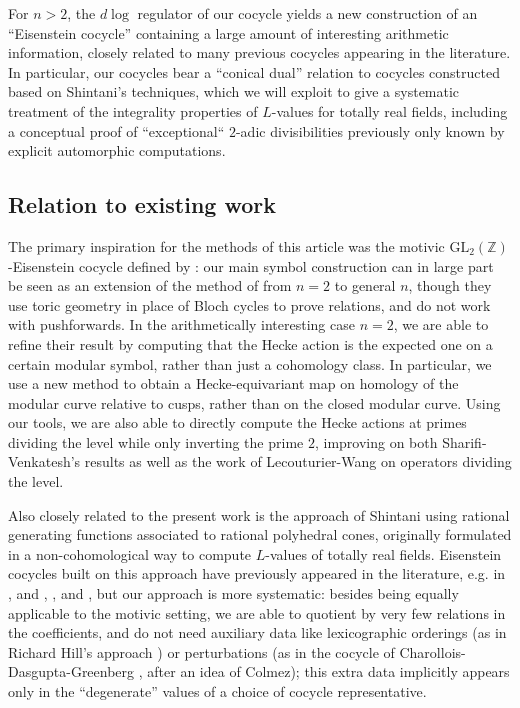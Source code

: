\documentclass[10pt]{amsart}
\theoremstyle{definition}
\newcommand{\Z}{\mathbb{Z}}
\newcommand{\GL}{\mathrm{GL}}
\numberwithin{equation}{section}
\begin{document}
    For $n>2$, the $d\log$ regulator of our cocycle yields a new construction of an ``Eisenstein cocycle'' containing a large amount of interesting arithmetic information, closely related to many previous cocycles appearing in the literature. In particular, our cocycles bear a ``conical dual'' relation to cocycles constructed based on Shintani's techniques, which we will exploit to give a systematic treatment of the integrality properties of $L$-values for totally real fields, including a conceptual proof of ``exceptional`` $2$-adic divisibilities previously only known by explicit automorphic computations.

    \subsection{Relation to existing work}
    
    The primary inspiration for the methods of this article was the motivic $\GL_2(\Z)$-Eisenstein cocycle defined by \cite{SV}: our main symbol construction can in large part be seen as an extension of the method of \cite[\S5]{SV} from $n=2$ to general $n$, though they use toric geometry in place of Bloch cycles to prove relations, and do not work with pushforwards. In the arithmetically interesting case $n=2$, we are able to refine their result by computing that the Hecke action is the expected one on a certain modular symbol, rather than just a cohomology class. In particular, we use a new method to obtain a Hecke-equivariant map on homology of the modular curve relative to cusps, rather than on the closed modular curve. Using our tools, we are also able to directly compute the Hecke actions at primes dividing the level while only inverting the prime $2$, improving on both Sharifi-Venkatesh's results as well as the work of Lecouturier-Wang \cite{LcW} on operators dividing the level.
    
    Also closely related to the present work is the approach of Shintani \cite{Shin} using rational generating functions associated to rational polyhedral cones, originally formulated in a non-cohomological way to compute $L$-values of totally real fields. Eisenstein cocycles built on this approach have previously appeared in the literature, e.g. in \cite{SH}, \cite{CD} and \cite{CDG}, \cite{Hill}, and \cite{LP}, but our approach is more systematic: besides being equally applicable to the motivic setting, we are able to quotient by very few relations in the coefficients, and do not need auxiliary data like lexicographic orderings (as in Richard Hill's approach \cite{Hill}) or perturbations (as in the cocycle of Charollois-Dasgupta-Greenberg \cite{CDG}, after an idea of Colmez); this extra data implicitly appears only in the ``degenerate'' values of a choice of cocycle representative. 
    
\end{document}
